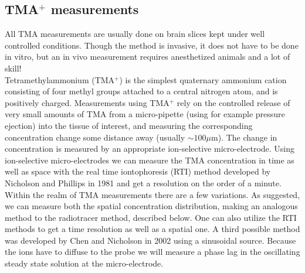 \documentclass[a4paper,english, 12pt, twoside]{article}
\begin{document}
\subsection{TMA$^+$ measurements}
All TMA measurements are usually done on brain slices kept under well controlled conditions. 
Though the method is invasive, it does not have to be done in vitro, but an in vivo measurement requires anesthetized animals and a lot of skill!\\
Tetramethylammonium (TMA$^+$) is the simplest quaternary ammonium cation consisting of four methyl groups attached to a central nitrogen atom, and is positively charged. 
Measurements using TMA$^+$ rely on the controlled release of very small amounts of TMA from a micro-pipette (using for example pressure ejection) into the tissue of interest, and measuring the corresponding concentration change some distance away (usually $\sim100\mu$m). 
The change in concentration is measured by an appropriate ion-selective micro-electrode. 
Using ion-selective micro-electrodes we can measure the TMA concentration in time as well as space with the real time iontophoresis (RTI) method developed by Nicholson and Phillips in 1981 \cite{nicholson1981ion} and get a resolution on the order of a minute.\\
Within the realm of TMA measurements there are a few variations. 
As suggested, we can measure both the spatial concentration distribution, making an analogous method to the radiotracer method, described below. 
One can also utilize the RTI methods to get a time resolution as well as a spatial one. 
A third possible method was developed by Chen and Nicholson in 2002 \cite{chen2002measurement} using a sinusoidal source. 
Because the ions have to diffuse to the probe we will measure a phase lag in the oscillating steady state solution at the micro-electrode. 
\end{document}
